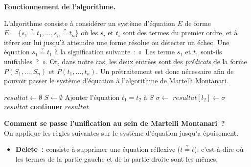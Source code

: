 \documentclass[11pt]{article}
\newenvironment{paraph}[1]{%
  \medskip
  \noindent\textbf{#1.}\quad

  \vspace{0.2cm}
}{%
  \medskip
}
\begin{document}
\begin{paraph}{Fonctionnement de l'algorithme}
    L'algorithme consiste à considérer un système d'équation $E$
    de forme $E = \{ s_1 \overset{?}{=} t_1, \dots, s_n \overset{?}{=} t_n \}$
    où les $s_i$ et $t_i$ sont des termes du premier ordre,
    et à itérer sur lui jusqu'à atteindre une forme résolue ou 
    détecter un échec. Une équation $s_1 \overset{?}{=} t_1$ à la signification suivante~:
    «~Les terme $s_1$ et $t_1$ sont-ils unifiables~?~».
    Or, dans notre cas, les deux entrées sont des \textit{prédicats} 
    de la forme $P(S_1, \ldots, S_n)$ et $P(t_1, \ldots, t_n)$. 
    Un prétraitement est donc nécessaire afin de pouvoir passer 
    le système d'équation à l'algorithme de Martelli Montanari.

    \vspace{0.2cm}

\begin{algorithm}
\caption{Création du système d'équations et unification de littéraux}
\begin{algorithmic}[1]

    \State $resultat \leftarrow \emptyset$
     
        \State {}
            \State $S \leftarrow \emptyset$ 
                \State Ajouter l'équation $t_1 = t_2$ à $S$ 
            \EndFor
            \State $\sigma \leftarrow$  
                \State $resultat[l_2] \leftarrow \sigma$
                    \State \Return $resultat$ 
                \EndIf
            \Else
                \State \textbf{continuer} 
            \EndIf
        \EndIf
    \EndFor
    \State \Return $resultat$
\EndFunction

\end{algorithmic}
\end{algorithm}

    \newpage
    \vspace{0.2cm}
    \textbf{Comment se passe l'unification au sein de Martelli Montanari~?}\\
    On applique les règles suivantes sur le système d'équation jusqu'a épuisement.
    \begin{itemize}
    \vspace{0.2cm}
    \item \noindent \textbf{Delete~:} consiste à supprimer une équation réflexive ($t \overset{?}{=} t$), c'est-à-dire où les termes de la partie gauche et de la partie droite sont les mêmes.


\end{itemize}
\end{paraph}
\end{document}
